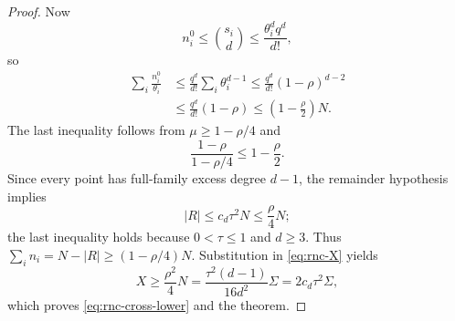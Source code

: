 \documentclass[10pt,a4paper]{amsart}
\begin{document}
\begin{proof}
Now
\[
 n_i^0\le\binom{s_i}{d}\le\frac{\theta_i^dq^d}{d!},
\]
so
\begin{align*}
 \sum_i\frac{n_i^0}{\theta_i}
 &\le\frac{q^d}{d!}\sum_i\theta_i^{d-1}
 \le\frac{q^d}{d!}(1-\rho)^{d-2}\\
 &\le\frac{q^d}{d!}(1-\rho)
 \le\left(1-\frac\rho2\right)N.
\end{align*}
The last inequality follows from $\mu\ge1-\rho/4$ and
\[
 \frac{1-\rho}{1-\rho/4}\le1-\frac\rho2.
\]
Since every point has full-family excess degree $d-1$, the remainder hypothesis implies
\[
 |R|\le c_d\tau^2N\le\frac\rho4N;
\]
the last inequality holds because $0<\tau\le1$ and $d\ge3$.
Thus $\sum_i n_i=N-|R|\ge(1-\rho/4)N$.  Substitution in \eqref{eq:rnc-X} yields
\[
 X\ge\frac{\rho^2}{4}N
 =\frac{\tau^2(d-1)}{16d^2}\Sigma
 =2c_d\tau^2\Sigma,
\]
which proves \eqref{eq:rnc-cross-lower} and the theorem.
\end{proof}
\end{document}
